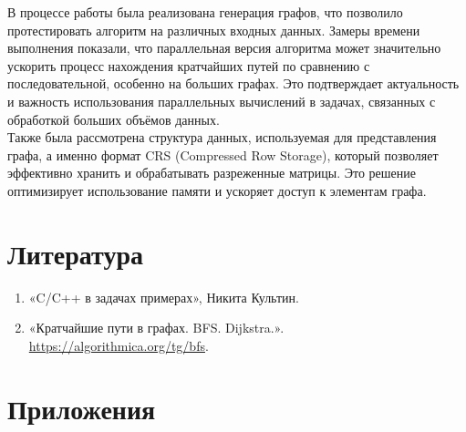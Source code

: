 \documentclass[a4paper, 14pt]{extarticle}
\begin{document}
В процессе работы была реализована генерация графов, что позволило протестировать алгоритм на различных входных данных. Замеры времени выполнения показали, что параллельная версия алгоритма может значительно ускорить процесс нахождения кратчайших путей по сравнению с последовательной, особенно на больших графах. Это подтверждает актуальность и важность использования параллельных вычислений в задачах, связанных с обработкой больших объёмов данных.\\

Также была рассмотрена структура данных, используемая для представления графа, а именно формат CRS (Compressed Row Storage), который позволяет эффективно хранить и обрабатывать разреженные матрицы. Это решение оптимизирует использование памяти и ускоряет доступ к элементам графа.

\newpage
\section{Литература}
\begin{enumerate}
    \item «C/C++ в задачах  примерах», Никита Культин.
    \item «Кратчайшие пути в графах. BFS. Dijkstra.».
    \url {https://algorithmica.org/tg/bfs}.
\end{enumerate}
\newpage
\section{Приложения}
\end{document}

